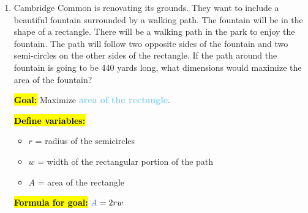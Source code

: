 \documentclass{article}
\newcommand{\highlight}[1]{\boldmath\hl{\textbf{#1}}\unboldmath}
\newcommand{\goal}[1]{\textbf{\textcolor{skyblue}{#1}}}
\begin{document}
\begin{enumerate}[resume]
\item 

  \begin{problem}[\newpage]
    Cambridge Common is renovating its grounds. They want to include a beautiful fountain surrounded by a walking path. The fountain will be in the shape of a rectangle. There will be a walking path in the park to enjoy the fountain. The path will follow two opposite sides of the fountain and two semi-circles on the other sides of the rectangle. If the path around the fountain is going to be 440 yards long, what dimensions would maximize the area of the fountain?

  \end{problem}

  \begin{solution} 
    \highlight{Goal:} Maximize \goal{area of the rectangle}.

    \highlight{Define variables:}
    \begin{itemize}[nosep]
    \item $r$ = radius of the semicircles
    \item $w$ = width of the rectangular portion of the path
    \item $A$ = area of the rectangle
    \end{itemize}
    \begin{center}
    \end{center}

    \highlight{Formula for goal:} $\goal{$A$} = 2rw$


\end{solution}
\end{enumerate}
\end{document}
